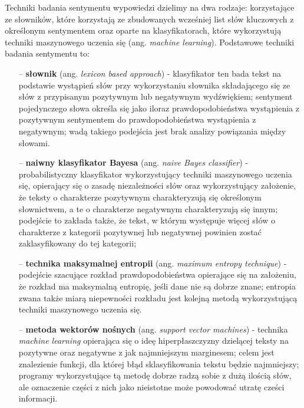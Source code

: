 Techniki badania sentymentu wypowiedzi dzielimy na dwa rodzaje: korzystające ze słowników, które korzystają ze zbudowanych wcześniej list słów kluczowych z określonym sentymentem oraz oparte na klasyfikatorach, które wykorzystują techniki maszynowego uczenia się (ang. \textit{machine learning}). Podstawowe techniki badania sentymentu to:
\begin{itemize}
	\item[--] \textbf{słownik} (ang. \textit{lexicon based approach}) - klasyfikator ten bada tekst na podstawie wystąpień słów przy wykorzystaniu słownika składającego się ze słów z przypisanym pozytywnym lub negatywnym wydźwiękiem; sentyment pojedynczego słowa określa się jako iloraz prawdopodobieństwa wystąpienia z pozytywnym sentymentem do prawdopodobieństwa wystąpienia z negatywnym; wadą takiego podejścia jest brak analizy powiązania między słowami.
	\item[--] \textbf{naiwny klasyfikator Bayesa} (ang. \textit{naive Bayes classifier}) - probabilistyczny klasyfikator wykorzystujący techniki maszynowego uczenia się, opierający się o zasadę niezależności słów oraz wykorzystujący założenie, że teksty o charakterze pozytywnym charakteryzują się określonym słownictwem, a te o charakterze negatywnym charakteryzują się innym; podejście to zakłada także, że tekst, w którym występuje więcej słów o charakterze z kategorii pozytywnej lub negatywnej powinien zostać zaklasyfikowany do tej kategorii;
	\item[--] \textbf{technika maksymalnej entropii} (ang. \textit{maximum entropy technique}) - podejście szacujące rozkład prawdopodobieństwa opierające się na założeniu, że rozkład  ma maksymalną entropię, jeśli dane nie są dobrze znane; entropia zwana także miarą niepewności rozkładu jest kolejną metodą wykorzystującą techniki maszynowego uczenia się.
	\item[--] \textbf{metoda wektorów nośnych} (ang. \textit{support vector machines}) - technika \textit{machine learning} opierająca się o ideę hiperpłaszczyzny dzielącej teksty na pozytywne oraz negatywne z jak najmniejszym marginesem; celem jest znalezienie funkcji, dla której błąd sklasyfikowania tekstu będzie najmniejszy; programy wykorzystujące tą metodę dobrze radzą sobie z dużą ilością słów, ale oznaczenie części z nich jako nieistotne może powodować utratę cześci informacji.
\end{itemize}

